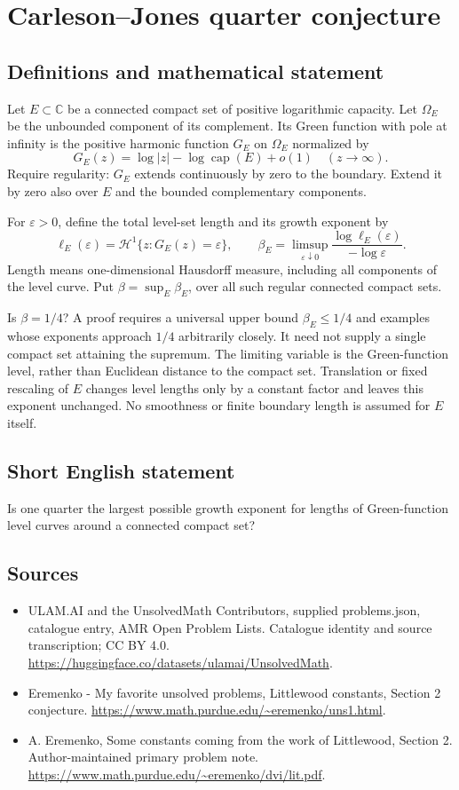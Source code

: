 \documentclass[11pt,a4paper]{article}
\begin{document}
\section*{Carleson–Jones quarter conjecture}\label{statement}

\subsection{Definitions and mathematical statement}
Let $E\subset\mathbb C$ be a connected compact set
of positive logarithmic capacity. Let $\Omega_E$
be the unbounded component of its complement.
Its Green function with pole at infinity is
the positive harmonic function $G_E$ on
$\Omega_E$ normalized by
\[
 G_E(z)=\log|z|-\log\operatorname{cap}(E)+o(1)
                                      \quad(z\to\infty).
\]
Require regularity: $G_E$ extends continuously by
zero to the boundary. Extend it by zero also
over $E$ and the bounded complementary components.

For $\varepsilon>0$, define the total level-set
length and its growth exponent by
\[
 \ell_E(\varepsilon)=
             \mathcal H^1\{z:G_E(z)=\varepsilon\},
 \qquad
 \beta_E=\limsup_{\varepsilon\downarrow0}
             \frac{\log\ell_E(\varepsilon)}{-\log\varepsilon}.
\]
Length means one-dimensional Hausdorff measure,
including all components of the level curve.
Put $\beta=\sup_E\beta_E$, over all such
regular connected compact sets.

Is $\beta=1/4$? A proof requires a universal
upper bound $\beta_E\leq1/4$ and examples
whose exponents approach $1/4$ arbitrarily
closely. It need not supply a single compact
set attaining the supremum.
The limiting variable is the Green-function
level, rather than Euclidean distance to the
compact set. Translation or fixed rescaling
of $E$ changes level lengths only by a
constant factor and leaves this exponent
unchanged. No smoothness or finite boundary
length is assumed for $E$ itself.
\subsection{Short English statement}
Is one quarter the largest possible growth exponent for lengths of Green-function level curves around a connected compact set?
\subsection{Sources}
\begin{itemize}
\item[S1] ULAM.AI and the UnsolvedMath Contributors, supplied problems.json, catalogue entry, AMR Open Problem Lists. Catalogue identity and source transcription; CC BY 4.0.
\url{https://huggingface.co/datasets/ulamai/UnsolvedMath}.
\item[S2] Eremenko - My favorite unsolved problems, Littlewood constants, Section 2 conjecture. 
\url{https://www.math.purdue.edu/~eremenko/uns1.html}.
\item[S3] A. Eremenko, Some constants coming from the work of Littlewood, Section 2. Author-maintained primary problem note.
\url{https://www.math.purdue.edu/~eremenko/dvi/lit.pdf}.
\end{itemize}
\end{document}
